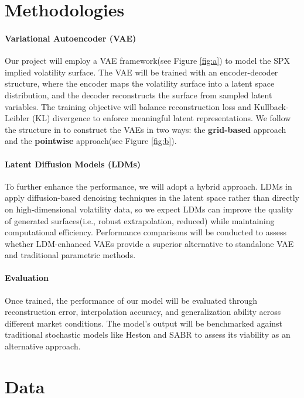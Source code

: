 \documentclass{article}
\newcommand{\figref}[1]{Figure \ref{#1}}
\begin{document}
\section{Methodologies}
\paragraph{Variational Autoencoder (VAE)}
Our project will employ a VAE framework(see \figref{fig:a}) to model the SPX implied volatility surface. The VAE will be trained with an encoder-decoder structure, where the encoder maps the volatility surface into a latent space distribution, and the decoder reconstructs the surface from sampled latent variables. The training objective will balance reconstruction loss and Kullback-Leibler (KL) divergence to enforce meaningful latent representations. We follow the structure in \cite{vaeorigin} to construct the VAEs in two ways: the \textbf{grid-based} approach and the \textbf{pointwise} approach(see \figref{fig:b}).

\paragraph{Latent Diffusion Models (LDMs)}
To further enhance the performance, we will adopt a hybrid approach. LDMs in \cite{rombach2022highresolutionimagesynthesislatent} apply diffusion-based denoising techniques in the latent space rather than directly on high-dimensional volatility data, so we expect LDMs can  improve the quality of generated surfaces(i.e., robust extrapolation, reduced) while maintaining computational efficiency. Performance comparisons will be conducted to assess whether LDM-enhanced VAEs provide a superior alternative to standalone VAE and traditional parametric methods.



\paragraph{Evaluation} Once trained, the performance of our model will be evaluated through reconstruction error, interpolation accuracy, and generalization ability across different market conditions. The model’s output will be benchmarked against traditional stochastic models like Heston \cite{wolfram_volsurface_heston} and SABR \cite{wolfram_volsurface_sabr} to assess its viability as an alternative approach.

\section{Data}
\end{document}
